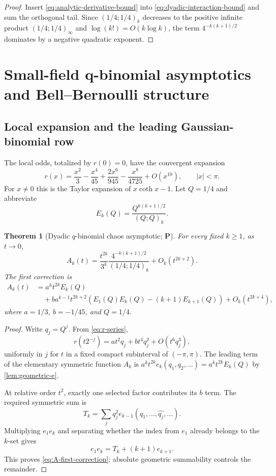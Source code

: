 \documentclass[11pt,oneside]{article}
\newtheorem{theorem}{Theorem}[section]
\theoremstyle{definition}
\theoremstyle{remark}
\newcommand{\OmittedSymmetricArgument}[1]{\widehat{#1}}
\newcommand{\statusP}{\textcolor{deepgreen}{\textbf{P}}}
\begin{document}
\begin{proof}
Insert \eqref{eq:analytic-derivative-bound} into
\eqref{eq:dyadic-interaction-bound} and sum the orthogonal tail.  Since
$(1/4;1/4)_k$ decreases to the positive infinite product
$(1/4;1/4)_\infty$ and $\log(k!)=O(k\log k)$, the term
$4^{-k(k+1)/2}$ dominates by a negative quadratic exponent.
\end{proof}

\section{Small-field q-binomial asymptotics and Bell--Bernoulli structure}
\label{sec:q-small}

\subsection{Local expansion and the leading Gaussian-binomial row}

The local odds, totalized by $r(0)=0$, have the convergent expansion
\begin{equation}
 r(x)=\frac{x^2}{3}-\frac{x^4}{45}+\frac{2x^6}{945}
  -\frac{x^8}{4725}+O(x^{10}),
 \qquad |x|<\pi.
 \label{eq:r-series}
\end{equation}
For $x\ne0$ this is the Taylor expansion of $x\coth x-1$.
Let $Q=1/4$ and abbreviate
\begin{equation}
 E_k(Q)=\frac{Q^{k(k+1)/2}}{(Q;Q)_k}.
 \label{eq:E-k-Q}
\end{equation}

\begin{theorem}[Dyadic $q$-binomial chaos asymptotic; \statusP]
\label{thm:q-leading}
For every fixed $k\ge1$, as $t\to0$,
\begin{equation}
 \boxed{
 A_k(t)=\frac{t^{2k}}{3^k}
 \frac{4^{-k(k+1)/2}}{(1/4;1/4)_k}
 +O_k(t^{2k+2}).}
 \label{eq:A-leading}
\end{equation}
The first correction is
\begin{align}
 A_k(t)
 &=a^kt^{2k}E_k(Q)\\
 &\quad+ba^{k-1}t^{2k+2}
 \left(E_1(Q)E_k(Q)-(k+1)E_{k+1}(Q)\right)
 +O_k(t^{2k+4}),
 \label{eq:A-first-correction}
\end{align}
where $a=1/3$, $b=-1/45$, and $Q=1/4$.
\end{theorem}

\begin{proof}
Write $q_j=Q^j$.  From \eqref{eq:r-series},
\[
 r(t2^{-j})=at^2q_j+bt^4q_j^2+O(t^6q_j^3),
\]
uniformly in $j$ for $t$ in a fixed compact subinterval of $(-\pi,\pi)$.
The leading term of the elementary symmetric function $A_k$ is
$a^kt^{2k}e_k(q_1,q_2,\ldots)=a^kt^{2k}E_k(Q)$ by
\cref{lem:geometric-e}.

At relative order $t^2$, exactly one selected factor contributes its $b$ term.
The required symmetric sum is
\[
 T_k=\sum_jq_j^2e_{k-1}(q_1,\ldots,\OmittedSymmetricArgument{q_j},\ldots).
\]
Multiplying $e_1e_k$ and separating whether the index from $e_1$ already
belongs to the $k$-set gives
\[
 e_1e_k=T_k+(k+1)e_{k+1}.
\]
This proves \eqref{eq:A-first-correction}; absolute geometric summability
controls the remainder.
\end{proof}
\end{document}
